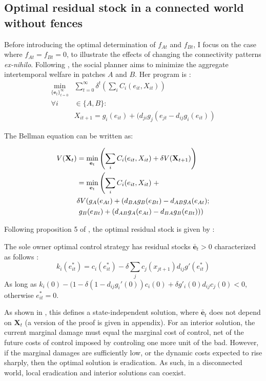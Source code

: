 \subsection{Optimal residual stock in a connected world without fences}
Before introducing the optimal determination of $f_{At}$ and $f_{Bt}$, I focus on the case where $f_{At} = f_{Bt} = 0$, to illustrate the effects of changing the connectivity patterns \textit{ex-nihilo}.  Following \cite{costello_private_2017}, the social planner aims to minimize the aggregate intertemporal welfare in patches $A$ and $B$. Her program is : 
\begin{align}
\min_{\{\mathbf{e}_t\}_{t=0}^\infty}& \sum_{t=0}^\infty \delta^t \left(\sum_i C_i(e_{it}, X_{it}) \right) \nonumber  \\
\forall i& \in \{A, B\}: \nonumber  \\\
& X_{it+1} = g_i(e_{it}) + (d_{ji}g_j(e_{jt} - d_{ij}g_i(e_{it}))
\end{align}

The Bellman equation can be written as:

\begin{align}
V(\mathbf{X}_t) & = \min_{\mathbf{e}_t} \left( \sum_i C_i(e_{it}, X_{it}) + \delta V(\mathbf{X}_{t+1}) \right) \nonumber  \\
& = \min_{\mathbf{e}_t} \left( \sum_i C_i(e_{it}, X_{it})\right. + \nonumber \\
 &\delta V\large( g_{A}(e_{At}) + (d_{BA}g_B(e_{Bt}) - d_{AB}g_A(e_{At});\nonumber \\
& \left. g_{B}(e_{Bt}) + (d_{AB}g_A(e_{At}) - d_{BA}g_B(e_{Bt})\large)\right)
\end{align}

Following proposition 5 of \cite{costello_private_2017}, the optimal residual stock is given by :
\begin{proposition}
The sole owner optimal control strategy has residual stocks $\bar{\mathbf{e}}_{t}>0$ characterized as follows : 
\begin{equation}
k_i(e^*_{it}) = c_i(e^*_{it}) - \delta \sum_jc_j(x_{jt+1})d_{ij}g'(e^*_{it})
\label{eq:foc_costello}
\end{equation}
As long as $k_i(0)  - (1 - \delta (1 - d_{ij}g_i'(0))c_i(0) + \delta g'_i(0) d_{ij} c_j(0)<0$, otherwise $e^*_{it}=0$. 
\label{proposition:interior_costello}
\end{proposition}

As shown in \cite{costello_private_2017}, this defines a state-independent solution, where $\bar{\mathbf{e}}_t$ does not depend on $\mathbf{X}_t$ (a version of the proof is given in appendix). For an interior solution, the current marginal damage must equal the marginal cost of control, net of the future costs of control imposed by controling one more unit of the bad. However, if the marginal damages are sufficiently low, or the dynamic costs expected to rise sharply, then the optimal solution is eradication. As such, in a disconnected world, local eradication and interior solutions can coexist. 

